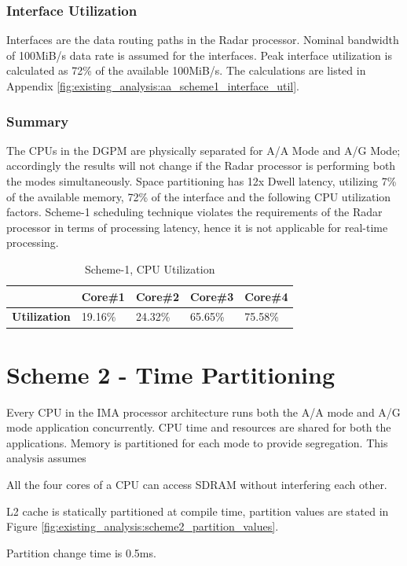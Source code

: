 \subsubsection{Interface Utilization}
\label{sec:scheme1:aa_interface_util}
Interfaces are the data routing paths in the Radar processor. Nominal bandwidth of 100MiB/s data rate is assumed for the interfaces.  Peak interface utilization is calculated as 72\% of the available 100MiB/s. The calculations are listed in Appendix \ref{fig:existing_analysis:aa_scheme1_interface_util}.

\subsubsection{Summary}
The CPUs in the DGPM are physically separated for A/A Mode and A/G Mode; accordingly the results will not change if the Radar processor is performing both the modes simultaneously. Space partitioning has 12x Dwell latency, utilizing 7\% of the available memory, 72\% of the interface and the following CPU utilization factors. Scheme-1 scheduling technique violates the requirements of the Radar processor in terms of processing latency, hence it is not applicable for real-time processing.

\begin{table}[h!]
	\centering
	\begin{tabular}{|l|l|l|l|l|} 
	 \hline
	& \textbf{Core\#1} & \textbf{Core\#2} & \textbf{Core\#3} & \textbf{Core\#4} \\ \hline
	\textbf{Utilization} & 19.16\% & 24.32\% & 65.65\% & 75.58\% \\ \hline
	\end{tabular}
	\caption{Scheme-1, CPU Utilization}
\end{table}



\clearpage
\section{Scheme 2 - Time Partitioning}
\label{sec:scheme2}
Every CPU in the IMA processor architecture runs both the A/A mode and A/G mode application concurrently. CPU time and resources are shared for both the applications. Memory is partitioned for each mode to provide segregation. This analysis assumes
\begin{compactitem}
	\item All the four cores of a CPU can access SDRAM without interfering each other.
	\item L2 cache is statically partitioned at compile time, partition values are stated in Figure \ref{fig:existing_analysis:scheme2_partition_values}.
	\item Partition change time is 0.5ms. 
\end{compactitem} 

